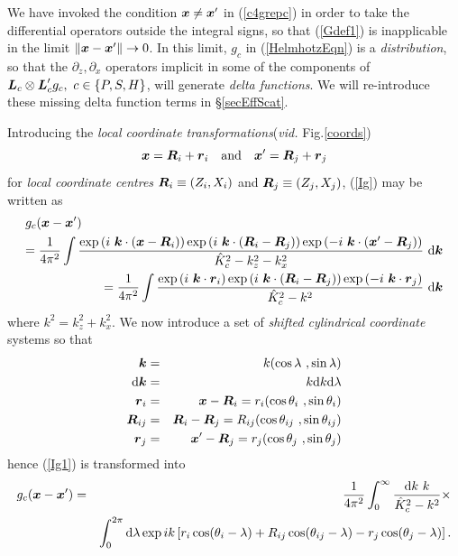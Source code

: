 We have invoked the condition ${\mbox{\boldmath$\mit x$\unboldmath}}\not={{\mbox{\boldmath$\mit x$\unboldmath}}}^{\prime}$ in (\ref{c4grepc})
in order to take the differential operators outside the integral signs, 
so that (\ref{Gdef1}) is inapplicable in the limit $\| {\mbox{\boldmath$\mit x$\unboldmath}}-{{\mbox{\boldmath$\mit x$\unboldmath}}}^{\prime} \|\rightarrow 0$. In this limit, ${  g}_{c }$ in 
(\ref{HelmhotzEqn}) is a {\em distribution\/}, so that the $\partial_z, 
\partial_x$ 
operators implicit in some of the components of ${\bmi 
L}_{c} \otimes {\bmi  L}_{c}^{\prime}{  g}_{c }, \ c\in\{P,S,H\}$, will 
generate {\em 
delta functions\/}. We will re-introduce these missing delta function 
terms in \S\ref{secEffScat}.

Introducing the {\em local coordinate transformations\/}({\em vid.\/} {Fig}.\ref{coords})
\[
{\mbox{\boldmath$\mit x$\unboldmath}}={\mbox{\boldmath$\mit R$\unboldmath}}_{i}+{\mbox{\boldmath$\mit r$\unboldmath}}_{i} \quad \mbox{and} \quad 
{\mbox{\boldmath$\mit x$\unboldmath}}^{\prime}={\mbox{\boldmath$\mit R$\unboldmath}}_{j}+{\mbox{\boldmath$\mit r$\unboldmath}}_{j}
\]
for  {\em local coordinate centres\/}  ${\mbox{\boldmath$\mit R$\unboldmath}}_{i}\equiv(Z_i,X_i)$ and ${\mbox{\boldmath$\mit R$\unboldmath}}_{j}\equiv(Z_j,X_j)$, 
(\ref{Ig}) may be
written as
\begin{eqnarray} \label{Ig1} 
\lefteqn{{g}_{c }({\bmi  x} -{\bmi  x}^{\prime} )}\nonumber\\
&&\!\!\!\!\!\!
={\frac{1}{4{ \pi }^{2}}}
\int {\frac{
\exp \left({i\ {\bmi  k}
\cdot ({\bmi  x} -{\bmi  R}_{i})}\right) 
\exp \left({i\ {\bmi  k}
\cdot ({\bmi  R}_{i} -{\bmi  R}_{j})}\right)
\exp \left({-i\ {\bmi  k}
\cdot ({\bmi  x}^{\prime} -{\bmi  R}_{j} )}\right)} 
{\hat{ K}_{c}^{2}-{k}_{z}^{2}-{k}_{x}^{2}}}\ {{\rm d}}{\bmi  k}\nonumber\\
&&\!\!\!\!\!\!
={\frac{1}{4{ \pi }^{2}}}
\int {\frac{
\exp \left({i\ {\bmi  k}
\cdot {\bmi  r}_{i}}\right) 
\exp \left({i\ {\bmi  k}
\cdot ({\bmi  R}_{i} -{\bmi  R}_{j})}\right)
\exp \left({-i\ {\bmi  k}
\cdot {\bmi  r}_{j}}\right)} 
{\hat{ K}_{c}^{2}-{k}^{2}}}\ {{\rm d}}{\bmi  k}
\end{eqnarray}
where  ${k}^{2}={k}_{z}^{2}+{k}_{x}^{2}$.
We now introduce a set of {\em shifted cylindrical coordinate\/} systems
so that
\begin{eqnarray} 
{\bmi  k}&=&k(\cos \lambda \ ,\sin \lambda)\nonumber\\ 
{ {\rm d}}{\bmi  k}&=&k {{\rm d}}{ k} {{\rm d}}{\lambda}\nonumber\\ 
{\bmi  r}_{i}&=&{\bmi  x}-{\bmi  R}_i=r_{i}(\cos \theta_i \ ,\sin 
\theta_i)\nonumber\\
{\bmi  R}_{ij}&=&{\bmi  R}_{i}-{\bmi  R}_{j}= R_{ij}(\cos \theta_{ij} \ 
,\sin\theta_{ij})\nonumber\\
 {\bmi  r}_{j}&=&{\bmi  x}^{\prime}-{\bmi  R}_{j}=r_{j}(\cos \theta_j \ ,\sin 
 \theta_j)
\end{eqnarray} 
hence (\ref{Ig1}) is transformed into
\begin{eqnarray} \label{Ig2} {g}_{c }({\mbox{\boldmath$\mit x$\unboldmath}} -{\mbox{\boldmath$\mit x$\unboldmath}}^{\prime} 
)&=&{\frac{1}{4{ \pi }^{2}}}
\int_{0}^{\infty}  
\frac{{{\rm d}}{ k}\  k}{{\hat{ K}_{c }^{2}-{k}^{2}}} \times \nonumber\\ &&
\int_{0}^{2 \pi}{{\rm d}}{\lambda}
\exp i k \left[ {  r_{i}}\cos(\theta_i-\lambda) + {  
R}_{ij}\cos(\theta_{ij}-\lambda) -  {
r}_{j} \cos(\theta_j-\lambda) 
\right] .
\end{eqnarray} 

